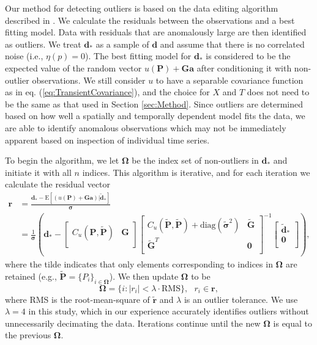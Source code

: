 \documentclass[10pt,letter]{article}
\begin{document}
Our method for detecting outliers is based on the data editing algorithm described in \citet{Gibbs2011}. We calculate the residuals between the observations and a best fitting model. Data with residuals that are anomalously large are then identified as outliers. We treat $\bm{d}_*$ as a sample of $\bm{d}$ and assume that there is no correlated noise (i.e., $\eta(p) = 0$).  The best fitting model for $\bm{d}_*$ is considered to be the expected value of the random vector $u(\bm{P}) + \bm{G}\bm{a}$ after conditioning it with non-outlier observations.  We still consider $u$ to have a separable covariance function as in eq. (\ref{eq:TransientCovariance}), and the choice for $X$ and $T$ does not need to be the same as that used in Section \ref{sec:Method}. Since outliers are determined based on how well a spatially and temporally dependent model fits the data, we are able to identify anomalous observations which may not be immediately apparent based on inspection of individual time series. 

To begin the algorithm, we let $\bm{\Omega}$ be the index set of non-outliers in $\bm{d}_*$ and initiate it with all $n$ indices. This algorithm is iterative, and for each iteration we calculate the residual vector
\begin{align}\label{eq:Residual}
\bm{r} &= \frac{\bm{d}_* - \mathrm{E}\left[(u(\bm{P}) + \bm{G}\bm{a})|\tilde{\bm{d}}_* \right]}{\bm{\sigma}} \\
       &= \frac{1}{\bm{\sigma}}\left(\bm{d}_*  - 
          \left[\begin{array}{cc}
                C_u(\bm{P},\tilde{\bm{P}}) & \bm{G} \\
                \end{array}\right]
          \left[\begin{array}{cc}
                C_u(\tilde{\bm{P}},\tilde{\bm{P}}) + \mathrm{diag}(\tilde{\bm{\sigma}}^2) & \tilde{\bm{G}} \\
                \tilde{\bm{G}}^T  & \bm{0} \\
                \end{array}\right]^{-1}
          \left[\begin{array}{c}
                \tilde{\bm{d}}_* \\
                \bm{0} \\
                \end{array}\right]\right),
\end{align}
where the tilde indicates that only elements corresponding to indices in $\bm{\Omega}$ are retained (e.g., $\tilde{\bm{P}} = \{P_i\}_{i\in\bm{\Omega}}$). We then update $\bm{\Omega}$ to be
\begin{equation}\label{eq:Update}
\bm{\Omega} = \{i : |r_i| < \lambda \cdot \mathrm{RMS}\}, \ \ \ r_i \in \bm{r},
\end{equation} 
where RMS is the root-mean-square of $\tilde{\bm{r}}$ and $\lambda$ is an outlier tolerance. We use $\lambda=4$ in this study, which in our experience accurately identifies outliers without unnecessarily decimating the data. Iterations continue until the new $\bm{\Omega}$ is equal to the previous $\bm{\Omega}$. 
\end{document}
